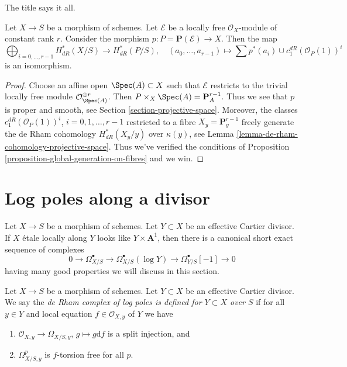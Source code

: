 \noindent
The title says it all.

\begin{proposition}
\label{proposition-projective-space-bundle-formula}
Let $X \to S$ be a morphism of schemes. Let $\mathcal{E}$ be a locally
free $\mathcal{O}_X$-module of constant rank $r$. Consider the morphism
$p : P = \mathbf{P}(\mathcal{E}) \to X$.
Then the map
$$
\bigoplus\nolimits_{i = 0, \ldots, r - 1} H^*_{dR}(X/S)
\longrightarrow
H^*_{dR}(P/S), \quad
(a_0, \ldots, a_{r - 1}) \longmapsto
\sum p^*(a_i) \cup c_1^{dR}(\mathcal{O}_P(1))^i
$$
is an isomorphism.
\end{proposition}

\begin{proof}
Choose an affine open $\Spec(A) \subset X$ such that $\mathcal{E}$ restricts
to the trivial locally free module $\mathcal{O}_{\Spec(A)}^{\oplus r}$.
Then $P \times_X \Spec(A) = \mathbf{P}^{r - 1}_A$. Thus we see that
$p$ is proper and smooth, see Section \ref{section-projective-space}.
Moreover, the classes $c_1^{dR}(\mathcal{O}_P(1))^i$, $i = 0, 1, \ldots, r - 1$
restricted to a fibre $X_y = \mathbf{P}^{r - 1}_y$ freely generate the
de Rham cohomology $H^*_{dR}(X_y/y)$ over $\kappa(y)$, see
Lemma \ref{lemma-de-rham-cohomology-projective-space}. Thus we've verified the
conditions of Proposition \ref{proposition-global-generation-on-fibres}
and we win.
\end{proof}








\section{Log poles along a divisor}
\label{section-divisor}

\noindent
Let $X \to S$ be a morphism of schemes. Let $Y \subset X$ be an
effective Cartier divisor. If $X$ \'etale locally along $Y$ looks
like $Y \times \mathbf{A}^1$, then there is a canonical short exact sequence
of complexes
$$
0 \to \Omega^\bullet_{X/S} \to
\Omega^\bullet_{X/S}(\log Y) \to
\Omega^\bullet_{Y/S}[-1] \to 0
$$
having many good properties we will discuss in this section.

\begin{definition}
\label{definition-local-product}
Let $X \to S$ be a morphism of schemes. Let $Y \subset X$ be an
effective Cartier divisor. We say the
{\it de Rham complex of log poles is defined for $Y \subset X$ over $S$}
if for all $y \in Y$ and local equation $f \in \mathcal{O}_{X, y}$
of $Y$ we have
\begin{enumerate}
\item $\mathcal{O}_{X, y} \to \Omega_{X/S, y}$, $g \mapsto g \text{d}f$
is a split injection, and
\item $\Omega^p_{X/S, y}$ is $f$-torsion free for all $p$.
\end{enumerate}
\end{definition}

